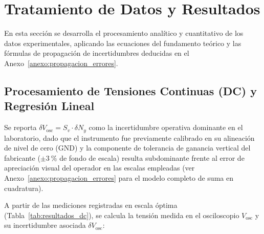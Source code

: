 
\section{Tratamiento de Datos y Resultados}
\label{sec:tratamiento}

En esta sección se desarrolla el procesamiento analítico y cuantitativo de los datos experimentales, aplicando las ecuaciones del fundamento teórico y las fórmulas de propagación de incertidumbres deducidas en el Anexo~\ref{anexo:propagacion_errores}.

\subsection{Procesamiento de Tensiones Continuas (DC) y Regresión Lineal}
Se reporta $\delta V_{\text{osc}} = S_v \cdot \delta N_y$ como la incertidumbre operativa dominante en el laboratorio, dado que el instrumento fue previamente calibrado en su alineación de nivel de cero ($\text{GND}$) y la componente de tolerancia de ganancia vertical del fabricante ($\pm\qty{3}{\percent}$ de fondo de escala) resulta subdominante frente al error de apreciación visual del operador en las escalas empleadas (ver Anexo~\ref{anexo:propagacion_errores} para el modelo completo de suma en cuadratura).

A partir de las mediciones registradas en escala óptima (Tabla~\ref{tab:resultados_dc}), se calcula la tensión medida en el osciloscopio $V_{\text{osc}}$ y su incertidumbre asociada $\delta V_{\text{osc}}$:

